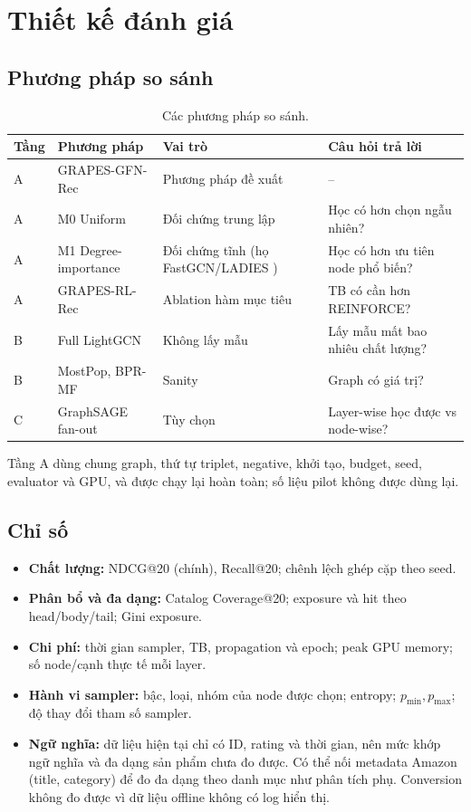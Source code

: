\documentclass[11pt,a4paper]{article}
\begin{document}
\section{Thiết kế đánh giá}

\subsection{Phương pháp so sánh}
\begin{table}[h]
\centering\small
\caption{Các phương pháp so sánh.}\label{tab:comp}
\begin{tabularx}{\linewidth}{llYY}
\toprule
Tầng & Phương pháp & Vai trò & Câu hỏi trả lời \\
\midrule
A & GRAPES-GFN-Rec & Phương pháp đề xuất & -- \\
A & M0 Uniform & Đối chứng trung lập & Học có hơn chọn ngẫu nhiên? \\
A & M1 Degree-importance & Đối chứng tĩnh (họ FastGCN/LADIES \cite{fastgcn,ladies}) & Học có hơn ưu tiên node phổ biến? \\
A & GRAPES-RL-Rec & Ablation hàm mục tiêu & TB có cần hơn REINFORCE? \\
B & Full LightGCN & Không lấy mẫu & Lấy mẫu mất bao nhiêu chất lượng? \\
B & MostPop, BPR-MF & Sanity & Graph có giá trị? \\
C & GraphSAGE fan-out \cite{graphsage} & Tùy chọn & Layer-wise học được vs node-wise? \\
\bottomrule
\end{tabularx}
\end{table}
Tầng A dùng chung graph, thứ tự triplet, negative, khởi tạo, budget, seed, evaluator và GPU, và được chạy lại hoàn toàn; số liệu pilot không được dùng lại.

\subsection{Chỉ số}
\begin{itemize}
\item \textbf{Chất lượng:} NDCG@20 (chính), Recall@20; chênh lệch ghép cặp theo seed.
\item \textbf{Phân bổ và đa dạng:} Catalog Coverage@20; exposure và hit theo head/body/tail; Gini exposure.
\item \textbf{Chi phí:} thời gian sampler, TB, propagation và epoch; peak GPU memory; số node/cạnh thực tế mỗi layer.
\item \textbf{Hành vi sampler:} bậc, loại, nhóm của node được chọn; entropy; $p_{\min}, p_{\max}$; độ thay đổi tham số sampler.
\item \textbf{Ngữ nghĩa:} dữ liệu hiện tại chỉ có ID, rating và thời gian, nên mức khớp ngữ nghĩa và đa dạng sản phẩm chưa đo được. Có thể nối metadata Amazon (title, category) để đo đa dạng theo danh mục như phân tích phụ. Conversion không đo được vì dữ liệu offline không có log hiển thị.
\end{itemize}
\end{document}

